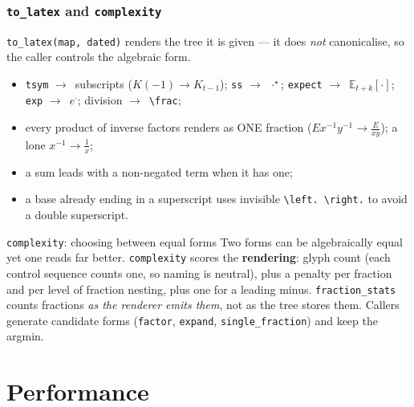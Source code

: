 \documentclass[10pt,slidestop]{beamer}
\newcommand{\code}[1]{\texttt{#1}}
\newcommand{\ra}{$\rightarrow$}
\begin{document}
\begin{frame}\frametitle{\texttt{to\_latex} and \texttt{complexity}}
  \code{to\_latex(map, dated)} renders the tree it is given --- it does
  \emph{not} canonicalise, so the caller controls the algebraic form.
  \begin{itemize}\small
  \item \code{tsym} \ra\ subscripts ($K(-1)\to K_{t-1}$); \code{ss} \ra\
    $\cdot^{\star}$; \code{expect} \ra\ $\mathbb{E}_{t+k}[\cdot]$; \code{exp} \ra\ $e^{\cdot}$;
    division \ra\ \code{\textbackslash frac};
  \item every product of inverse factors renders as ONE fraction
    ($E x^{-1} y^{-1} \to \frac{E}{xy}$); a lone $x^{-1}\to\frac{1}{x}$;
  \item a sum leads with a non-negated term when it has one;
  \item a base already ending in a superscript uses invisible
    \code{\textbackslash left. \textbackslash right.} to avoid a double superscript.
  \end{itemize}

  \begin{block}{\texttt{complexity}: choosing between equal forms}
    Two forms can be algebraically equal yet one reads far better. \code{complexity}
    scores the \textbf{rendering}: glyph count (each control sequence counts one,
    so naming is neutral), plus a penalty per fraction and per level of fraction
    nesting, plus one for a leading minus. \code{fraction\_stats} counts fractions
    \emph{as the renderer emits them}, not as the tree stores them. Callers
    generate candidate forms (\code{factor}, \code{expand}, \code{single\_fraction})
    and keep the argmin.
  \end{block}
\end{frame}

\section{Performance}
\end{document}
